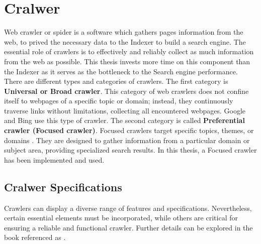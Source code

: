 \section{Cralwer}
\label{sec:crawler}
Web crawler or spider is a software which gathers pages information from the web, to prived the necessary data to the Indexer to build a search engine. The essential role of crawlers is to effectively and reliably collect as much information from the web as possible. This thesis invests more time on this component than the Indexer as it serves as the bottleneck to the Search engine performance. There are different types and categories of crawlers. The first category is  \textbf{Universal or Broad crawler}. This category of web crawlers does not confine itself to webpages of a specific topic or domain; instead, they continuously traverse links without limitations, collecting all encountered webpages. Google and Bing use this type of crawler. The second category is called \textbf{Preferential crawler (Focused crawler)}. Focused crawlers target specific topics, themes, or domains \cite{kumar2017survey}. They are designed to gather information from a particular domain or subject area, providing specialized search results. In this thesis, a Focused crawler has been implemented and used. 

\subsection{Cralwer Specifications}
\label{sec:cralwer-specifications}
Crawlers can display a diverse range of features and specifications. Nevertheless, certain essential elements must be incorporated, while others are critical for ensuring a reliable and functional crawler. Further details can be explored in the book referenced as \cite{manning2008}.

